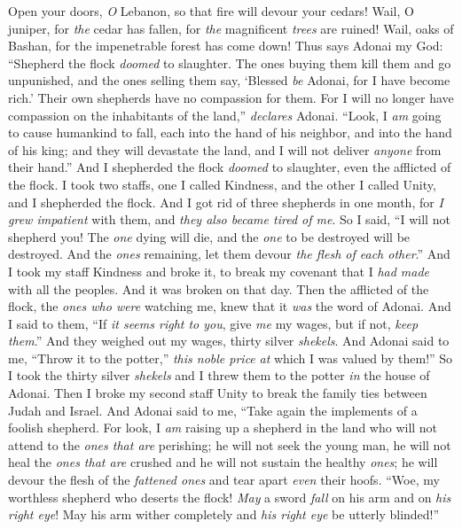 \begin{biblechapter} %
\verse Open your doors, \textit{O} Lebanon,
\verse so that fire will devour your cedars!
\verse Wail, O juniper, for \textit{the} cedar has fallen, 
for \textit{the} magnificent \textit{trees} are ruined! 
Wail, oaks of Bashan, 
for the impenetrable forest has come down!
 Thus says Adonai my God: “Shepherd the flock \textit{doomed} to slaughter.
\verse The ones buying them kill them and go unpunished, and the ones selling them say, ‘Blessed \textit{be} Adonai, for I have become rich.’ Their own shepherds have no compassion for them.
\verse For I will no longer have compassion on the inhabitants of the land,” \textit{declares} Adonai. “Look, I \textit{am} going to cause humankind to fall, each into the hand of his neighbor, and into the hand of his king; and they will devastate the land, and I will not deliver \textit{anyone} from their hand.”
\verse And I shepherded the flock \textit{doomed} to slaughter, even the afflicted of the flock. I took two staffs, one I called Kindness, and the other I called Unity, and I shepherded the flock.
\verse And I got rid of three shepherds in one month, for \textit{I grew impatient} with them, and \textit{they also became tired of me}.
\verse So I said, “I will not shepherd you! The \textit{one} dying will die, and the \textit{one} to be destroyed will be destroyed. And the \textit{ones} remaining, let them devour \textit{the flesh of each other}.”
\verse And I took my staff Kindness and broke it, to break my covenant that I \textit{had made} with all the peoples.
\verse And it was broken on that day. Then the afflicted of the flock, the \textit{ones who were} watching me, knew that it \textit{was} the word of Adonai.
\verse And I said to them, “If \textit{it seems right to you}, give \textit{me} my wages, but if not, \textit{keep them}.” And they weighed out my wages, thirty silver \textit{shekels}.
\verse And Adonai said to me, “Throw it to the potter,” \textit{this noble price} \textit{at} which I was valued by them!” So I took the thirty silver \textit{shekels} and I threw them to the potter \textit{in} the house of Adonai.
\verse Then I broke my second staff Unity to break the family ties between Judah and Israel.
\verse And Adonai said to me, “Take again the implements of a foolish shepherd.
\verse For look, I \textit{am} raising up a shepherd in the land who will not attend to the \textit{ones that are} perishing; he will not seek the young man, he will not heal the \textit{ones that are} crushed and he will not sustain the healthy \textit{ones}; he will devour the flesh of the \textit{fattened ones} and tear apart \textit{even} their hoofs.
\verse “Woe, my worthless shepherd 
who deserts the flock! 
\textit{May} a sword \textit{fall} on his arm 
and on \textit{his right eye}! 
May his arm wither completely 
and \textit{his right eye} be utterly blinded!”
\end{biblechapter}

